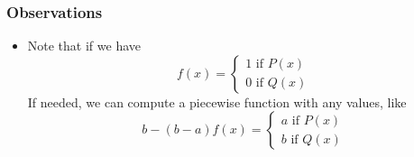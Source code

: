 \subsubsection{Observations}

\begin{itemize}
	\item Note that if we have
	\[
  			f(x)=\begin{cases}
               1 \text{ if } P(x) \\
               0 \text{ if } Q(x)
            \end{cases}
		\]
		If needed, we can compute a piecewise function with any values, like 
		\[
  			b - (b - a)f(x)=\begin{cases}
               a \text{ if } P(x) \\
               b \text{ if } Q(x)
            \end{cases}
		\]
		
\end{itemize}



